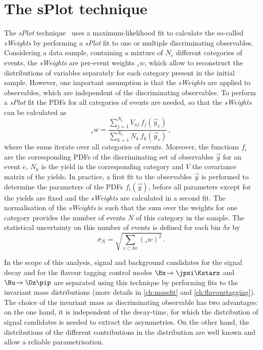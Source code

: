 \section{The sPlot technique}
\label{sec:splot}

The \emph{sPlot} technique~\cite{Pivk:2004ty} uses a maximum-likelihood fit to calculate the so-called \emph{sWeights} by performing a \emph{sPlot} fit to one or multiple discriminating observables.
Considering a data sample, containing a mixture of $N_c$ different categories of events, the \emph{sWeights} are per-event weights ${}_sw$, which allow to reconstruct the distributions of variables separately for each category present in the initial sample.
However, one important assumption is that the \emph{sWeights} are applied to observables, which are independent of the discriminating observables.
To perform a \emph{sPlot} fit the PDFs for all categories of events are needed, so that the \emph{sWeights} can be calculated as
\begin{equation}
{}_sw=\frac{\sum_{j=1}^{N_{\!c}}V_{\!nj}\,f_{\!j}(\vec{y}_e)}{\sum_{k=1}^{N_{\!c}}N_{\!k}\,f_{\!k}(\vec{y}_e)}\,,
\end{equation}
where the sums iterate over all categories of events.
Moreover, the functions $f_{\!i}$ are the corresponding PDFs of the discriminating set of observables $\vec{y}$ for an event $e$, $N_{\!k}$ is the yield in the corresponding category and $V$ the covariance matrix of the yields.
In practice, a first fit to the observables $\vec{y}$ is performed to determine the parameters of the PDFs $f_i(\vec{y})$, before all parameters except for the yields are fixed and the \emph{sWeights} are calculated in a second fit.
The normalisation of the \emph{sWeights} is such that the sum over the weights for one category provides the number of events $N$ of this category in the sample.
The statistical uncertainty on this number of events is defined for each bin $\delta x$ by
\begin{equation}
\sigma_N=\sqrt{\sum_{e\subset\delta x}({}_sw)^2}\,.
\end{equation}

In the scope of this analysis, signal and background candidates for the signal decay \mbox{\BdToDpi} and for the flavour tagging control modes $\Bz\!\to\jpsi\Kstarz$ and $\Bu\!\to\Dz\pip$ are separated using this technique by performing fits to the invariant mass distributions (more details in \cref{ch:massfit} and \cref{ch:flavourtagging}).
The choice of the invariant mass as discriminating observable has two advantages:
on the one hand, it is independent of the decay-time, for which the distribution of signal candidates is needed to \eg extract the \CP asymmetries.
On the other hand, the distributions of the different contributions in the distribution are well known and allow a reliable parametrisation.


